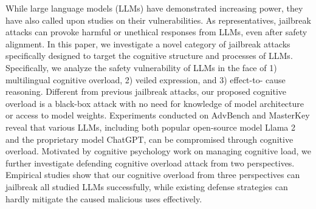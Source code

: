 While large language models (LLMs) have demonstrated increasing power, they have also called upon studies on their vulnerabilities. As representatives, jailbreak attacks can provoke harmful or unethical responses from LLMs, even after safety alignment. In this paper, we investigate a novel category of jailbreak attacks specifically designed to target the cognitive structure and processes of LLMs. Specifically, we analyze the safety vulnerability of LLMs in the face of 1) multilingual cognitive overload, 2) veiled expression, and 3) effect-to- cause reasoning. Different from previous jailbreak attacks, our proposed cognitive overload is a black-box attack with no need for knowledge of model architecture or access to model weights. Experiments conducted on AdvBench and MasterKey reveal that various LLMs, including both popular open-source model Llama 2 and the proprietary model ChatGPT, can be compromised through cognitive overload. Motivated by cognitive psychology work on managing cognitive load, we further investigate defending cognitive overload attack from two perspectives. Empirical studies show that our cognitive overload from three perspectives can jailbreak all studied LLMs successfully, while existing defense strategies can hardly mitigate the caused malicious uses effectively.